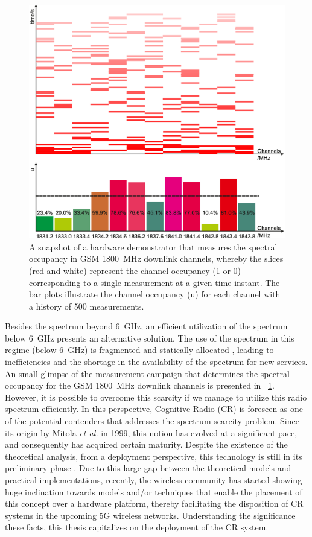 \begin{figure}[!t]
\centering
\includegraphics[width = 0.9\columnwidth]{figures/Grafik_Poster}
\caption{A snapshot of a hardware demonstrator that measures the spectral occupancy in GSM \SI{1800}{MHz} downlink channels, whereby the slices (red and white) represent the channel occupancy (1 or 0) corresponding to a single measurement at a given time instant. The bar plots illustrate the channel occupancy (u) for each channel with a history of 500 measurements\protect{}.}
\label{fig:HW_I}
\end{figure}


Besides the spectrum beyond \SI{6}{GHz}, an efficient utilization of the spectrum below \SI{6}{GHz} presents an alternative solution. The use of the spectrum in this regime (below \SI{6}{GHz}) is fragmented and statically allocated \cite{Mchen05, Mchen07}, leading to inefficiencies and the shortage in the availability of the spectrum for new services. An small glimpse of the measurement campaign that determines the spectral occupancy for the GSM \SI{1800}{MHz} downlink channels is presented in \figurename~\ref{fig:HW_I}. However, it is possible to overcome this scarcity if we manage to utilize this radio spectrum efficiently. In this perspective, Cognitive Radio (CR) is foreseen as one of the potential contenders that addresses the spectrum scarcity problem. Since its origin by Mitola \textit{et al.} in 1999, this notion has evolved at a significant pace, and consequently has acquired certain maturity. Despite the existence of the theoretical analysis, from a deployment perspective, this technology is still in its preliminary phase \cite{Pawe11}. Due to this large gap between the theoretical models and practical implementations, recently, the wireless community has started showing huge inclination towards models and/or techniques that enable the placement of this concept over a hardware platform, thereby facilitating the disposition of CR systems in the upcoming 5G wireless networks. Understanding the significance these facts, this thesis capitalizes on the deployment of the CR system. 


